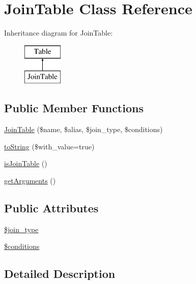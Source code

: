 \hypertarget{classJoinTable}{\section{Join\+Table Class Reference}
\label{classJoinTable}
}
Inheritance diagram for Join\+Table\+:\begin{figure}[H]
\begin{center}
\leavevmode
\includegraphics[height=2.000000cm]{classJoinTable}
\end{center}
\end{figure}
\subsection*{Public Member Functions}
\begin{DoxyCompactItemize}
\item 
\hyperlink{classJoinTable_a70859ad638b9149e97b8209d4f73610e}{Join\+Table} (\$name, \$alias, \$join\+\_\+type, \$conditions)
\item 
\hyperlink{classJoinTable_aa1e393a7b04e3b591ebd0fe6dff46f42}{to\+String} (\$with\+\_\+value=true)
\item 
\hyperlink{classJoinTable_aa26630df96bb0dac2ddcccff34c91530}{is\+Join\+Table} ()
\item 
\hyperlink{classJoinTable_a2f8aae7c1c5d0879f1085b9280018b4e}{get\+Arguments} ()
\end{DoxyCompactItemize}
\subsection*{Public Attributes}
\begin{DoxyCompactItemize}
\item 
\hyperlink{classJoinTable_a00c6a8c44beb3b85c9f3a3e5be03fba8}{\$join\+\_\+type}
\item 
\hyperlink{classJoinTable_aeaff6b550d1e29eef836ed19a8d65a99}{\$conditions}
\end{DoxyCompactItemize}


\subsection{Detailed Description}


